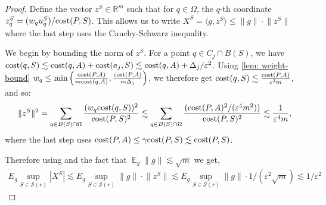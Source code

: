 \documentclass[11pt]{article}
\theoremstyle{restate}
\theoremstyle{definition}
\newcommand{\eps}{\ensuremath{\varepsilon}}
\newcommand{\R}{\ensuremath{\mathbb{R}}}
\newcommand{\norm}[1]{\ensuremath{\|#1\|}}
\newcommand{\E}{\mathop{\mathbb{E}}}
\newcommand{\cost}{\textnormal{cost}}
\newcommand{\uq}[2]{u^{#1}_{#2}} %
\newcommand{\inSR}{\in \mathcal{S}(r)}
\begin{document}
\begin{proof}
    Define the vector $z^S \in \R^m$ such that for $q \in \Omega$, the $q$-th coordinate $z_q^S = (w_q\uq{S}{q}) /\cost(P,S)$. This allows us to write $X^{S} = \langle g, z^S \rangle \leq \norm{g}\cdot {\norm{z^S}}$ where the last step uses the Cauchy-Schwarz inequality.

    
    \noindent We begin by bounding the norm of $z^S$. 
    For a point $q \in C_j \cap B(S)$, we have $\cost(q, S) \lesssim \cost(q, A) + \cost(a_j, S) \lesssim \cost(q, A) + \Delta_j / \eps^2$. 
    Using \cref{lem: weight-bound} $w_q \leq \min \left(\frac{\cost(P, A)}{m \cost(q, A)}, \frac{\cost(P, A)}{m\Delta_j}\right)$, we therefore get $\cost(q, S) \lesssim \frac{\cost(P, A)}{\eps^2 m}$, and so:
    \begin{align}\label{eq: zS-bound}
        \norm{z^S}^2 = \sum_{q \in B(S)\cap \Omega} \frac{(w_q \cost(q,S))^2}{\cost(P,S)^2} \lesssim \sum_{q \in B(S)\cap \Omega} \frac{(\cost(P,A)^2/(\eps^{4}m^2))}{\cost(P,S)^2} \lesssim \frac{1}{\eps^4m},
    \end{align}
    where the last step uses $\cost(P, A) \leq \gamma \cost(P, S) \lesssim \cost(P, S)$.

    Therefore using  and the fact that $\E_{g} \norm{g} \lesssim \sqrt{m}$ we get,
    \begin{align*}
    E_g \sup_{S\inSR} |X^S| \lesssim       E_g \sup_{S\inSR} \norm{g} \cdot \norm{z^S} \lesssim E_g \sup_{S\inSR} \norm{g} \cdot 1/(\eps^2 \sqrt{m} ) \lesssim  1/\eps^2
    \end{align*}
\end{proof}
    
\end{document}
